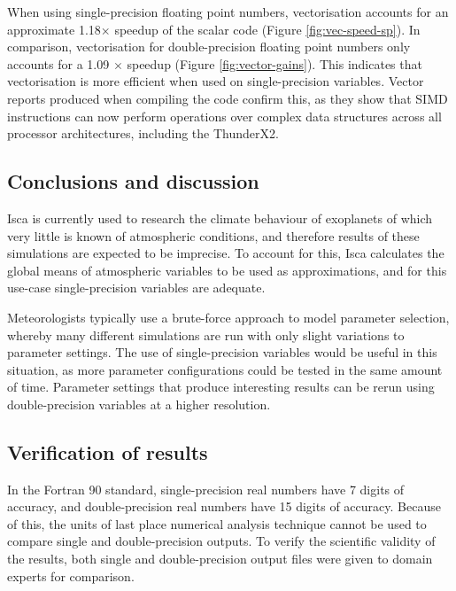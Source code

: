 \documentclass[a4paper,11pt]{report}
\begin{document}
\par
When using single-precision floating point numbers, vectorisation accounts for an approximate 1.18$\times$ speedup of the scalar code (Figure \ref{fig:vec-speed-sp}). In comparison, vectorisation for double-precision floating point numbers only accounts for a 1.09 $\times$ speedup (Figure \ref{fig:vector-gains}). This indicates that vectorisation is more efficient when used on single-precision variables. Vector reports produced when compiling the code confirm this, as they show that SIMD instructions can now perform operations over complex data structures across all processor architectures, including the ThunderX2. 
\par

\subsection{Conclusions and discussion}
\par
Isca is currently used to research the climate behaviour of exoplanets of which very little is known of atmospheric conditions, and therefore results of these simulations are expected to be imprecise. To account for this, Isca calculates the global means of atmospheric variables to be used as approximations, and for this use-case single-precision variables are adequate.
\par
Meteorologists typically use a brute-force approach to model parameter selection, whereby many different simulations are run with only slight variations to parameter settings. The use of single-precision variables would be useful in this situation, as more parameter configurations could be tested in the same amount of time. Parameter settings that produce interesting results can be rerun using double-precision variables at a higher resolution. 

\subsection{Verification of results}
In the Fortran 90 standard, single-precision real numbers have 7 digits of accuracy, and double-precision real numbers have 15 digits of accuracy. Because of this, the units of last place numerical analysis technique cannot be used to compare single and double-precision outputs. To verify the scientific validity of the results, both single and double-precision output files were given to domain experts for comparison. 
\end{document}
